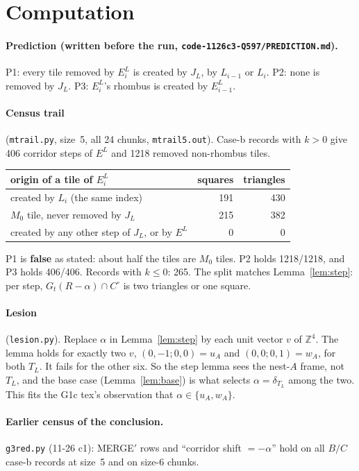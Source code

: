\documentclass[11pt]{article}
\newcommand{\Z}{\mathbb{Z}}
\begin{document}
\section{Computation}
\paragraph{Prediction (written before the run, \texttt{code-1126c3-Q597/PREDICTION.md}).} P1: every tile removed by $E^L_i$ is created by $J_L$, by $L_{i-1}$ or $L_i$. P2: none is removed by $J_L$. P3: $E^L_i$'s rhombus is created by $E^L_{i-1}$.
\paragraph{Census trail} (\texttt{mtrail.py}, size~5, all 24 chunks, \texttt{mtrail5.out}). Case-b records with $k>0$ give 406 corridor steps of $E^L$ and 1218 removed non-rhombus tiles.
\begin{center}\small\begin{tabular}{lrr}\toprule
origin of a tile of $E^L_i$ & squares & triangles\\\midrule
created by $L_i$ (the same index) & 191 & 430\\
$M_0$ tile, never removed by $J_L$ & 215 & 382\\
created by any other step of $J_L$, or by $E^L$ & 0 & 0\\\bottomrule
\end{tabular}\end{center}
P1 is \textbf{false} as stated: about half the tiles are $M_0$ tiles. P2 holds 1218/1218, and P3 holds 406/406. Records with $k\le0$: 265. The split matches Lemma~\ref{lem:step}: per step, $G_t(R-\alpha)\cap C^\circ$ is two triangles or one square.
\paragraph{Lesion} (\texttt{lesion.py}). Replace $\alpha$ in Lemma~\ref{lem:step} by each unit vector $v$ of $\Z^4$. The lemma holds for exactly two $v$, $(0,-1;0,0)=u_A$ and $(0,0;0,1)=w_A$, for both $T_L$. It fails for the other six. So the step lemma sees the nest-$A$ frame, not $T_L$, and the base case (Lemma~\ref{lem:base}) is what selects $\alpha=\delta_{T_L}$ among the two. This fits the G1c tex's observation that $\alpha\in\{u_A,w_A\}$.
\paragraph{Earlier census of the conclusion.} \texttt{g3red.py} (11-26 c1): MERGE$'$ rows and ``corridor shift $=-\alpha$'' hold on all $B/C$ case-b records at size~5 and on size-6 chunks.
\end{document}
